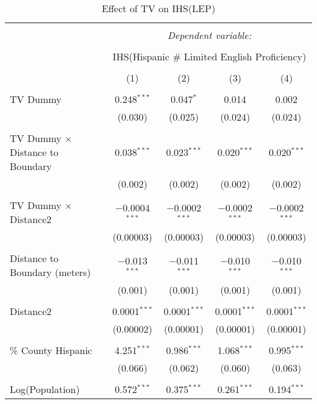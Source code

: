 
\begin{table}[!htbp] \centering 
  \caption{Effect of TV on IHS(LEP)} 
  \label{} 
\begin{tabular}{@{\extracolsep{-2pt}}lcccc} 
\\[-1.8ex]\hline 
\hline \\[-1.8ex] 
 & \multicolumn{4}{c}{\textit{Dependent variable:}} \\ 
\cline{2-5} 
\\[-1.8ex] & \multicolumn{4}{c}{IHS(Hispanic \# Limited English Proficiency)} \\ 
\\[-1.8ex] & (1) & (2) & (3) & (4)\\ 
\hline \\[-1.8ex] 
 TV Dummy & 0.248$^{***}$ & 0.047$^{*}$ & 0.014 & 0.002 \\ 
  & (0.030) & (0.025) & (0.024) & (0.024) \\ 
  & & & & \\ 
 TV Dummy $\times$ Distance to Boundary & 0.038$^{***}$ & 0.023$^{***}$ & 0.020$^{***}$ & 0.020$^{***}$ \\ 
  & (0.002) & (0.002) & (0.002) & (0.002) \\ 
  & & & & \\ 
 TV Dummy $\times$ Distance2 & $-$0.0004$^{***}$ & $-$0.0002$^{***}$ & $-$0.0002$^{***}$ & $-$0.0002$^{***}$ \\ 
  & (0.00003) & (0.00003) & (0.00003) & (0.00003) \\ 
  & & & & \\ 
 Distance to Boundary (meters) & $-$0.013$^{***}$ & $-$0.011$^{***}$ & $-$0.010$^{***}$ & $-$0.010$^{***}$ \\ 
  & (0.001) & (0.001) & (0.001) & (0.001) \\ 
  & & & & \\ 
 Distance2 & 0.0001$^{***}$ & 0.0001$^{***}$ & 0.0001$^{***}$ & 0.0001$^{***}$ \\ 
  & (0.00002) & (0.00001) & (0.00001) & (0.00001) \\ 
  & & & & \\ 
 \% County Hispanic & 4.251$^{***}$ & 0.986$^{***}$ & 1.068$^{***}$ & 0.995$^{***}$ \\ 
  & (0.066) & (0.062) & (0.060) & (0.063) \\ 
  & & & & \\ 
 Log(Population) & 0.572$^{***}$ & 0.375$^{***}$ & 0.261$^{***}$ & 0.194$^{***}$ \\ 

\end{tabular}
\end{table}
